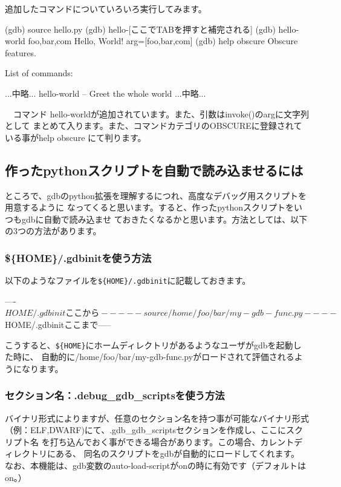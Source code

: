 \documentclass[mingoth,a4paper]{jsarticle}
\begin{document}
 追加したコマンドについていろいろ実行してみます。

\begin{commandline}
(gdb) source hello.py
(gdb) hello-[ここでTABを押すと補完される]
(gdb) hello-world foo,bar,com
Hello, World! arg=[foo,bar,com]
(gdb) help obscure
Obscure features.

List of commands:

...中略...
hello-world --  Greet the whole world 
...中略...
\end{commandline}

　コマンド hello-worldが追加されています。また、引数はinvoke()のargに文字列として
まとめて入ります。また、コマンドカテゴリのOBSCUREに登録されている事がhelp obscure
にて判ります。

\subsection{作ったpythonスクリプトを自動で読み込ませるには}

 ところで、gdbのpython拡張を理解するにつれ、高度なデバッグ用スクリプトを用意するように
なってくると思います。すると、作ったpythonスクリプトをいつもgdbに自動で読み込ませ
ておきたくなるかと思います。方法としては、以下の3つの方法があります。

\subsubsection{\$\{HOME\}/.gdbinitを使う方法}

 以下のようなファイルを\verb!${HOME}/.gdbinit!に記載しておきます。

\begin{commandline}
----${HOME}/.gdbinitここから-----
source /home/foo/bar/my-gdb-func.py
----${HOME}/.gdbinitここまで-----
\end{commandline}

こうすると、\verb!${HOME}!にホームディレクトリがあるようなユーザがgdbを起動した時に、
自動的に/home/foo/bar/my-gdb-func.pyがロードされて評価されるようになります。

\subsubsection{セクション名：.debug\_gdb\_scriptsを使う方法}

 バイナリ形式によりますが、任意のセクション名を持つ事が可能なバイナリ形式
（例：ELF,DWARF)にて、.gdb\_gdb\_scriptsセクションを作成し、ここにスクリプト名
を打ち込んでおく事ができる場合があります。この場合、カレントディレクトリにある、
同名のスクリプトをgdbが自動的にロードしてくれます。
なお、本機能は、gdb変数のauto-load-scriptがonの時に有効です（デフォルトはon。）
\end{document}
